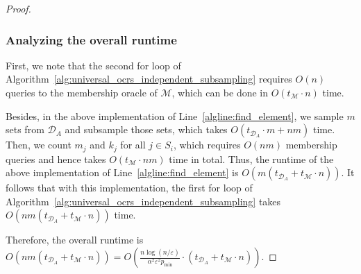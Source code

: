 \documentclass[11pt]{article}
\newcommand{\D}{\mathcal D}
\newcommand{\M}{{\mathcal M}}
\newcommand{\eps}{\varepsilon}
\begin{document}
\begin{proof}
\subsubsection*{Analyzing the overall runtime}
First, we note that the second for loop of Algorithm~\ref{alg:universal_ocrs_independent_subsampling} requires $O(n)$ queries to the membership oracle of $\M$, which can be done in $O(t_{\M}\cdot n)$ time.

Besides, in the above implementation of Line~\ref{algline:find_element}, we sample $m$ sets from $\D_A$ and subsample those sets, which takes $O(t_{\D_A}\cdot m+nm)$ time. Then, we count $m_j$ and $k_j$ for all $j\in S_i$, which requires $O(nm)$ membership queries and hence takes $O(t_{\M}\cdot nm)$ time in total. Thus, the runtime of the above implementation of Line~\ref{algline:find_element} is $O(m(t_{\D_A}+t_{\M}\cdot n))$. It follows that with this implementation, the first for loop of Algorithm~\ref{alg:universal_ocrs_independent_subsampling} takes $O(nm(t_{\D_A}+t_{\M}\cdot n))$ time.

Therefore, the overall runtime is $O(nm(t_{\D_A}+t_{\M}\cdot n))=O\left(\frac{n\log(n/\eps)}{\alpha^2\eps^2 p_{\min}}\cdot (t_{\D_A}+t_{\M}\cdot n)\right)$.
\end{proof}
\end{document}
